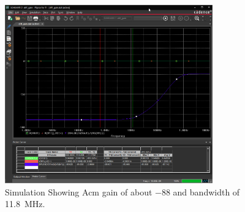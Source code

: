 \documentclass{article}
\newcommand \imgWidthFactor{0.8}
\begin{document}
		\begin{figure}[H]
			\centering
			\includegraphics[width=\imgWidthFactor\textwidth]{acm}
			\caption{Simulation Showing Acm gain of about \SI{-88}{} and bandwidth of \SI{11.8}{\MHz}.}
		\end{figure}
\end{document}
